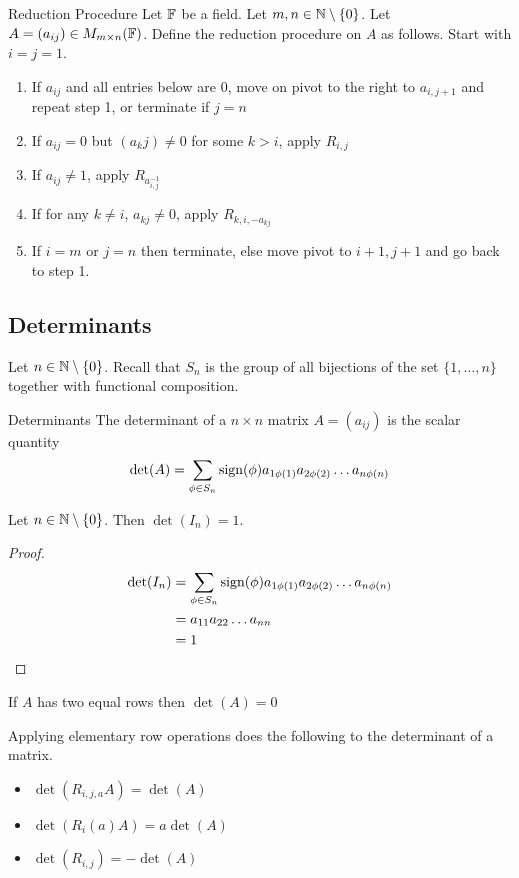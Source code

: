 \documentclass[a4paper]{article}
\begin{document}
\begin{defn}{Reduction Procedure}{} Let $\mathbb{F}$ be a field. Let $m,n\in\mathbb{N}\setminus\{0\}$. Let $A=(a_{ij})\in M_{m\times n}(\mathbb{F})$. Define the reduction procedure on $A$ as follows. Start with $i=j=1$. 
\begin{enumerate}
\item If $a_{ij}$ and all entries below are $0$, move on pivot to the right to $a_{i,j+1}$ and repeat step 1, or terminate if $j=n$
\item If $a_{ij}=0$ but $(a_kj)\neq 0$ for some $k>i$, apply $R_{i,j}$
\item If $a_{ij}\neq 1$, apply $R_{a_{i,j}^{-1}}$
\item If for any $k\neq i$, $a_{kj}\neq 0$, apply $R_{k,i,-a_{kj}}$
\item If $i=m$ or $j=n$ then terminate, else move pivot to $i+1,j+1$ and go back to step 1. 
\end{enumerate}
\end{defn}

\subsection{Determinants}
Let $n\in\mathbb{N}\setminus\{0\}$. Recall that $S_n$ is the group of all bijections of the set $\{1,\dots,n\}$ together with functional composition. 

\begin{defn}{Determinants}{} The determinant of a $n\times n$ matrix $A=(a_{ij})$ is the scalar quantity $$\det(A)=\sum_{\phi\in S_n}\operatorname{sign}(\phi)a_{1\phi(1)}a_{2\phi(2)}\dots a_{n\phi(n)}$$
\end{defn}

\begin{lmm}{}{} Let $n\in\mathbb{N}\setminus\{0\}$. Then $\det(I_n)=1$. 
\begin{proof} 
\begin{align*}
\det(I_n)&=\sum_{\phi\in S_n}\operatorname{sign}(\phi)a_{1\phi(1)}a_{2\phi(2)}\dots a_{n\phi(n)}\\
&=a_{11}a_{22}\dots a_{nn}\\
&=1
\end{align*}
\end{proof} 
\end{lmm}

\begin{prp}{}{} If $A$ has two equal rows then $\det(A)=0$
\end{prp}

\begin{prp}{}{} Applying elementary row operations does the following to the determinant of a matrix. 
\begin{itemize}
\item $\det(R_{i,j,a}A)=\det(A)$
\item $\det(R_{i}(a)A)=a\det(A)$
\item $\det(R_{i,j})=-\det(A)$
\end{itemize}
\end{prp}
\end{document}
